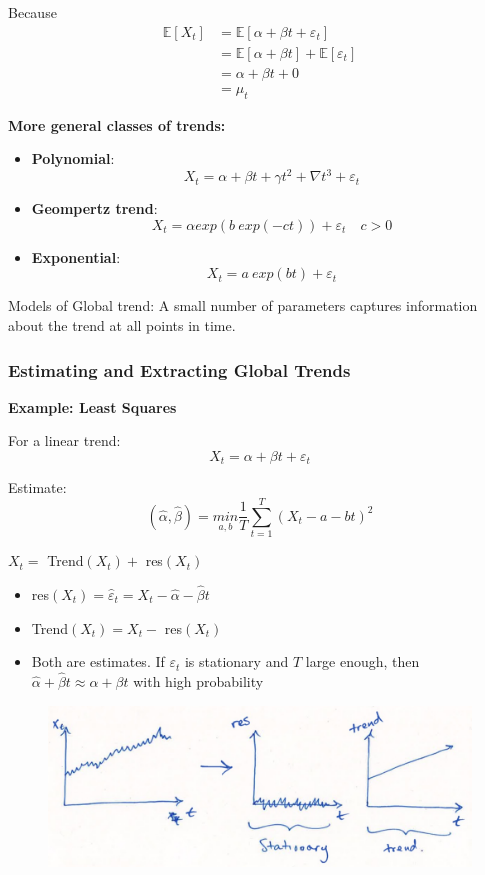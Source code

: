 Because
\begin{align*}
    \mathbb{E}[X_t] &= \mathbb{E}[\alpha + \beta t + \varepsilon_t] \\
    &= \mathbb{E}[\alpha + \beta t] + \mathbb{E}[\varepsilon_t] \\
    &= \alpha + \beta t + 0\\
    &= \mu_t
\end{align*}

\textbf{More general classes of trends:}
\begin{itemize}
    \item \textbf{Polynomial}: 
    \[X_t=\alpha+\beta t +\gamma t^2 + \nabla t^3 + \varepsilon_t\]
    \item \textbf{Geompertz trend}:
    \[X_t = \alpha exp(b\ exp(-ct)) + \varepsilon_t \quad c>0\]
    \item \textbf{Exponential}:
    \[X_t =a\ exp(bt) + \varepsilon_t\]
\end{itemize}
Models of Global trend: A small number of parameters captures information about the trend at all points in time.

\subsubsection{Estimating and Extracting Global Trends}

\textbf{Example: \quad Least Squares}

For a linear trend: \[X_t=\alpha + \beta t + \varepsilon_t\]

Estimate: \[(\hat{\alpha}, \hat{\beta})=\underset{a,b}{min} \frac{1}{T} \sum_{t=1}^T (X_t-a-bt)^2\]


$X_t =$ Trend$(X_t) + $ res$(X_t)$
\begin{itemize}
    \item res$(X_t)=\hat{\varepsilon}_t=X_t-\hat{\alpha} -\hat{\beta}t $
    \item Trend$(X_t)=X_t-$ res$(X_t)$
    \item Both are estimates. If $\varepsilon_t$ is stationary and $T$ large enough, then $\hat{\alpha}+\hat{\beta}t \approx \alpha+\beta t$ with high probability
\end{itemize}

\begin{figure}[H]
\includegraphics[scale=0.3]{images/Screenshot 2024-03-29 at 16.08.14.jpg}
\centering
\end{figure}

